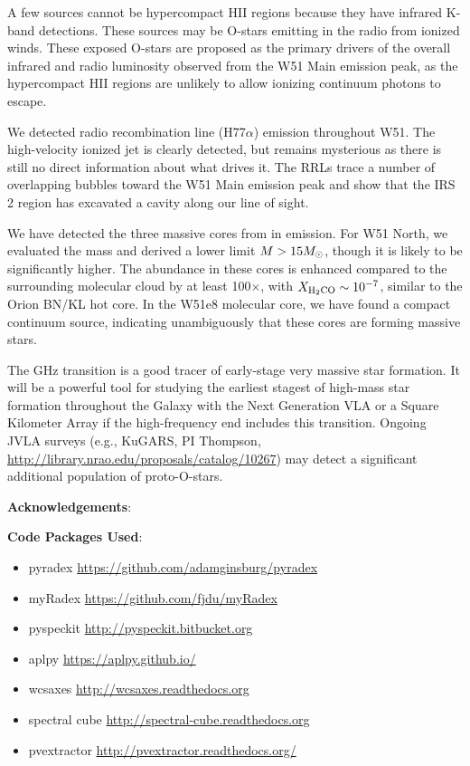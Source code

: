 A few sources cannot be hypercompact HII regions because they have infrared
K-band detections.  These sources may be O-stars emitting in the radio from
ionized winds.  These exposed O-stars are proposed as the primary drivers of
the overall infrared and radio luminosity observed from the W51 Main emission
peak, as the hypercompact HII regions are unlikely to allow ionizing continuum
photons to escape.

We detected radio recombination line (H77$\alpha$) emission throughout W51.
The \citet{Lacy2007a} high-velocity ionized jet is clearly detected, but
remains mysterious as there is still no direct information about what drives
it.  The RRLs trace a number of overlapping bubbles toward the W51 Main
emission peak and show that the IRS 2 region has excavated a cavity along our
line of sight.

We have detected the three massive cores from \citet{Zhang1997a} in
\formaldehyde \twotwo emission.  For W51 North, we evaluated the mass and
derived a lower limit $M>15 M_{\odot}$, though it is likely to be significantly
higher.  The \formaldehyde abundance in these cores is enhanced compared to the
surrounding molecular cloud by at least 100$\times$, with $X_{\textrm{H}_2\textrm{CO}}
\sim 10^{-7}$, similar to the Orion BN/KL hot core.  In the W51e8 molecular
core, we have found a compact continuum source, indicating unambiguously that
these cores are forming massive stars.

The \formaldehyde {} GHz transition is a good tracer of early-stage
very massive star formation.  It will be a powerful tool for studying the earliest
stagest of high-mass star formation throughout the Galaxy with the Next Generation VLA
or a Square Kilometer Array if the high-frequency end includes this transition.
Ongoing JVLA surveys (e.g., KuGARS, PI Thompson,
\url{http://library.nrao.edu/proposals/catalog/10267}) may detect a significant
additional population of proto-O-stars.




\textbf{Acknowledgements}:

\textbf{Code Packages Used}:

\begin{itemize}
    \item pyradex \url{https://github.com/adamginsburg/pyradex}
    \item myRadex \url{https://github.com/fjdu/myRadex}
    \item pyspeckit \url{http://pyspeckit.bitbucket.org}
    \item aplpy \url{https://aplpy.github.io/}
    \item wcsaxes \url{http://wcsaxes.readthedocs.org}
    \item spectral cube \url{http://spectral-cube.readthedocs.org}
    \item pvextractor \url{http://pvextractor.readthedocs.org/}
\end{itemize}

